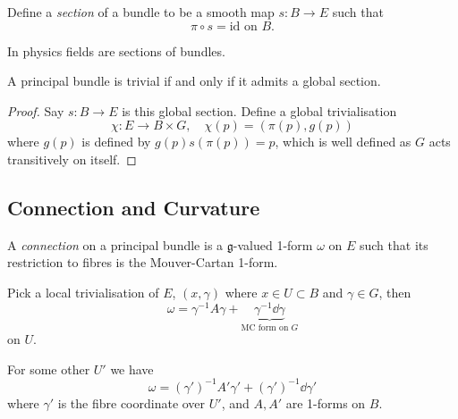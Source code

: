 \documentclass[a4paper,11pt]{article}
\begin{document}
    \begin{defi}[Section]
        Define a \emph{section} of a bundle to be a smooth map $s : B \to E$ such that 
        \begin{equation}
            \pi \circ s = \text{id on } B.
        \end{equation}

        In physics fields are sections of bundles.
    \end{defi}

    \begin{prop}
        A principal bundle is trivial if and only if it admits a global section.
    \end{prop}
    \begin{proof}
        Say $s : B \to E$ is this global section. Define a global trivialisation 
        \begin{equation}
            \chi : E \to B \times G, \quad \chi(p) = (\pi(p), g(p))
        \end{equation}
        where $g(p)$ is defined by $g(p) s(\pi(p)) = p$, which is well defined as $G$ acts transitively on itself. 
    \end{proof}

    \subsection{Connection and Curvature}
    \begin{defi}[Connection]
        A \emph{connection} on a principal bundle is a $\mathfrak{g}$-valued 1-form $\omega$ on $E$ such that its restriction to fibres is the Mouver-Cartan 1-form. 
    \end{defi}

    Pick a local trivialisation of $E$, $(x, \gamma)$ where $x \in U \subset B$ and $\gamma \in G$, then 
    \begin{equation}
        \omega = \gamma^{-1} A \gamma + \underbrace{\gamma^{-1} \dd{\gamma}}_{\text{MC form on }G} \label{eq:connection on E}
    \end{equation}
    on $U$.
    
    For some other $U'$ we have 
    \begin{equation}
        \omega = (\gamma')^{-1} A' \gamma' + (\gamma')^{-1} \dd{\gamma'}
    \end{equation}
    where $\gamma'$ is the fibre coordinate over $U'$, and $A,A'$ are 1-forms on $B$.
    
\end{document}
